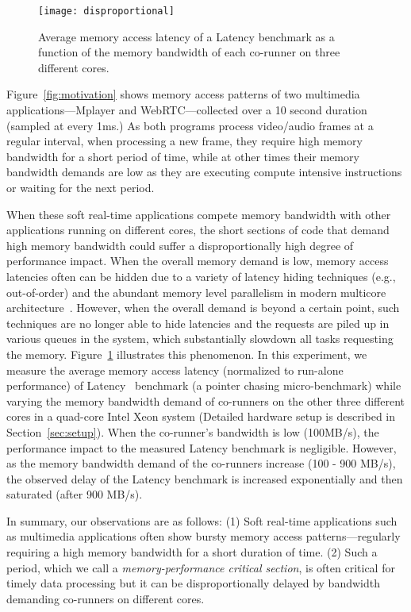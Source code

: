 \documentclass[times, 10pt,onecolumn]{article}
\begin{document}
\begin{figure}[t]
\centering
\centering
\texttt{[image: disproportional]}
\caption{Average memory access latency of a Latency
benchmark as a function of the memory bandwidth of
each co-runner on three different cores.}
\label{fig:disproportional}
\end{figure}


Figure~\ref{fig:motivation} shows memory access patterns of two
multimedia applications---Mplayer and WebRTC---collected over a 10
second duration (sampled at every 1ms.)
As both programs process video/audio frames at a regular interval, when
processing a new frame, they require high memory bandwidth for a short
period of time, while at other times their memory bandwidth demands
are low as they are executing compute intensive instructions or
waiting for the next period.

When these soft real-time applications compete memory bandwidth with
other applications running on different cores, the short sections of
code that demand high memory bandwidth could suffer a disproportionally
high degree of performance impact. When the overall memory demand is
low, memory access latencies often can be hidden due to a variety of
latency hiding techniques (e.g., out-of-order) and the abundant memory
level parallelism in modern multicore
architecture~\cite{hennessy2011computer}.
However, when the overall demand is beyond a certain point, such
techniques are no longer able to hide latencies and the requests are
piled up in various queues in the system, which substantially slowdown
all tasks requesting the memory.
Figure~\ref{fig:disproportional} illustrates
this phenomenon. In this experiment, we measure the average memory access
latency (normalized to run-alone performance) of
Latency~\cite{yun2013rtas} benchmark (a pointer chasing
micro-benchmark) while varying the memory bandwidth demand of
co-runners on the other three different cores in a quad-core Intel
Xeon system (Detailed hardware setup is described in
Section~\ref{sec:setup}). When the co-runner's bandwidth is
low (100MB/s), the performance impact to the measured Latency benchmark is
negligible. However, as the memory bandwidth demand of the
co-runners increase (100 - 900 MB/s), the observed delay of
the Latency benchmark is increased exponentially and then saturated
(after 900 MB/s).

In summary, our observations are as follows:
(1) Soft real-time applications such as multimedia applications often
show bursty memory access patterns---regularly requiring a high
memory bandwidth for a short duration of time. (2) Such a period,
which we call a \emph{memory-performance critical section}, is often
critical for timely data processing but it can be disproportionally
delayed by bandwidth demanding co-runners on different cores.
\end{document}
